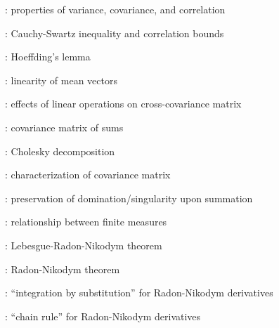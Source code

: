 \item {}: properties of variance, covariance, and correlation
\item {}: Cauchy-Swartz inequality and correlation bounds
\item {}: Hoeffding's lemma
\item {}: linearity of mean vectors
\item {}: effects of linear operations on cross-covariance matrix
\item {}: covariance matrix of sums
\item {}: Cholesky decomposition
\item {}: characterization of covariance matrix
\item {}: preservation of domination/singularity upon summation
\item {}: relationship between finite measures
\item {}: Lebesgue-Radon-Nikodym theorem
\item {}: Radon-Nikodym theorem
\item {}: ``integration by substitution'' for Radon-Nikodym derivatives
\item {}: ``chain rule'' for Radon-Nikodym derivatives
